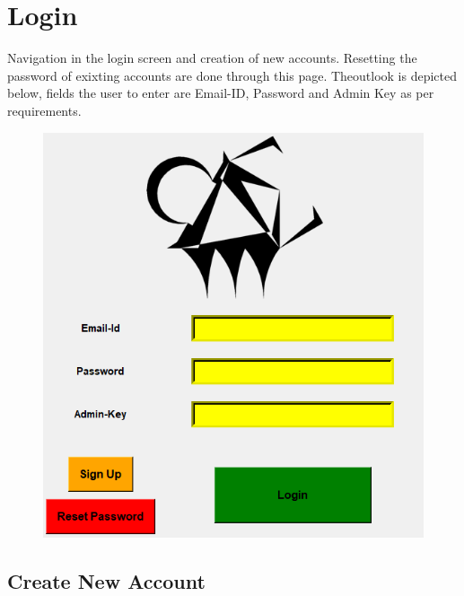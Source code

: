 \chapter{Login}

Navigation in the login screen and creation of new accounts. Resetting the password of exixting accounts are done through this page. Theoutlook is depicted below, fields the user to enter are Email-ID, Password and Admin Key as per requirements.  

\begin{figure}[H]
	\centering
	\includegraphics[width=0.6\linewidth]{images/login_page/login_1}
	\label{fig:login1}
\end{figure}

\section{Create New Account}

